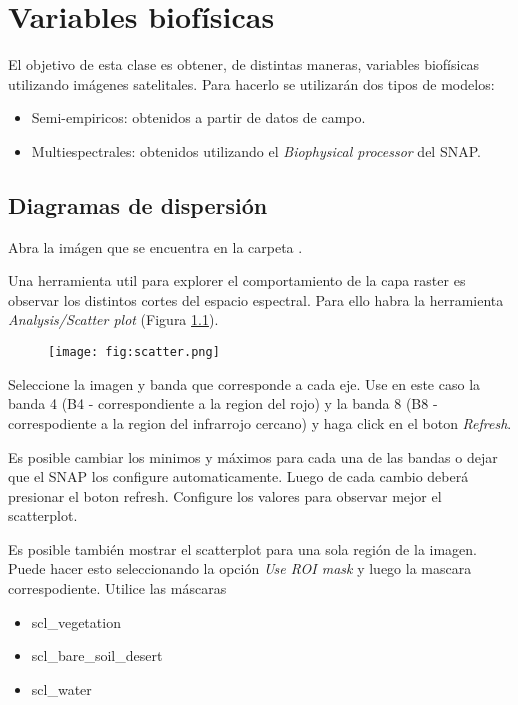 \chapter{Variables biofísicas}
El objetivo de esta clase es obtener, de distintas maneras, variables biofísicas utilizando imágenes satelitales. Para hacerlo se utilizarán dos tipos de modelos:

\begin{itemize}
    \item Semi-empiricos: obtenidos a partir de datos de campo.
    \item Multiespectrales: obtenidos utilizando el \emph{Biophysical processor} del SNAP.
\end{itemize}

\section{Diagramas de dispersión}

Abra la imágen  que se encuentra en la carpeta .

Una herramienta util para explorer el comportamiento de la capa raster es observar los distintos cortes del espacio espectral. Para ello habra la herramienta \emph{Analysis/Scatter plot} (Figura \ref{fig:scatter}).

\begin{figure}[h!]
    \centering
    \texttt{[image: fig:scatter.png]}
    \caption{}
    \label{fig:scatter}
\end{figure}

Seleccione la imagen y banda que corresponde a cada eje. Use en este caso la banda 4 (B4 - correspondiente a la region del rojo) y la banda 8 (B8 - correspodiente a la region del infrarrojo cercano) y haga click en el boton \emph{Refresh}.

Es posible cambiar los minimos y máximos para cada una de las bandas o dejar que el SNAP los configure automaticamente. Luego de cada cambio deberá presionar el boton refresh. Configure los valores para observar mejor el scatterplot.

Es posible también mostrar el scatterplot para una sola región de la imagen. Puede hacer esto seleccionando la opción \emph{Use ROI mask} y luego la mascara correspodiente. Utilice las máscaras

\begin{itemize}
    \item scl\_vegetation
    \item scl\_bare\_soil\_desert
    \item scl\_water
\end{itemize}

